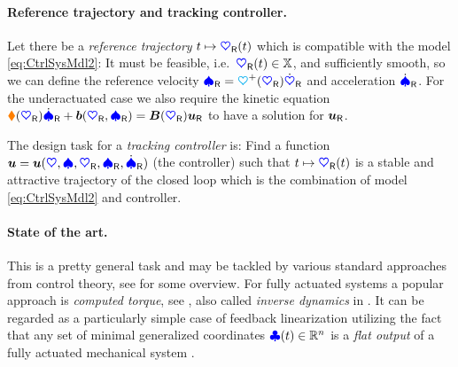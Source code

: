 
\paragraph{Reference trajectory and tracking controller.}
Let there be a \textit{reference trajectory} $t\mapsto\sysCoordR(t)$ which is compatible with the model \eqref{eq:CtrlSysMdl2}:
It must be feasible, i.e.\ $\sysCoordR(t)\in\configSpace$, and sufficiently smooth, so we can define the reference velocity $\sysVelR = \kinMat^+(\sysCoordR) \sysCoordRd$ and acceleration $\sysVelRd$.
For the underactuated case we also require the kinetic equation $\sysInertiaMat(\sysCoordR) \sysVelRd + \sysForce(\sysCoordR,\sysVelR) = \sysInputMat(\sysCoordR)\sysInputR$ to have a solution for $\sysInputR$.

The design task for a \textit{tracking controller} is: 
Find a function $\sysInput = \sysInput(\sysCoord, \sysVel, \sysCoordR, \sysVelR, \sysVelRd)$ (the controller) such that $t \mapsto \sysCoordR(t)$ is a stable and attractive trajectory of the closed loop which is the combination of model \eqref{eq:CtrlSysMdl2} and controller.

\paragraph{State of the art.}
This is a pretty general task and may be tackled by various standard approaches from control theory, see \eg \cite[chap.\,7-10]{Spong:RobotModelingAndControl} for some overview.
For fully actuated systems a popular approach is \textit{computed torque}, see \eg \cite[sec.\,4.5.2]{Murray:Robotic}, also called \textit{inverse dynamics} in \cite[sec.\,8.3]{Spong:RobotModelingAndControl}.
It can be regarded as a particularly simple case of feedback linearization utilizing the fact that any set of minimal generalized coordinates $\genCoord(t)\in\RealNum^{\dimConfigSpace}$ is a \textit{flat output} of a fully actuated mechanical system \cite[sec.\,7.1]{Martin:FlatSystems}.

